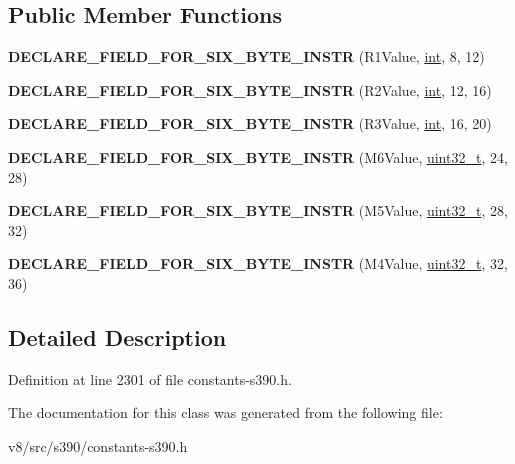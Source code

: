 \subsection*{Public Member Functions}
\begin{DoxyCompactItemize}
\item 
\mbox{\label{classv8_1_1internal_1_1VRR__C__Instruction_a70ae43e84e5f0782beb31729985f4ab5}} 
{\bfseries D\+E\+C\+L\+A\+R\+E\+\_\+\+F\+I\+E\+L\+D\+\_\+\+F\+O\+R\+\_\+\+S\+I\+X\+\_\+\+B\+Y\+T\+E\+\_\+\+I\+N\+S\+TR} (R1\+Value, \mbox{\hyperlink{classint}{int}}, 8, 12)
\item 
\mbox{\label{classv8_1_1internal_1_1VRR__C__Instruction_a3cc43c1da54fe11ee86626ee17661a4b}} 
{\bfseries D\+E\+C\+L\+A\+R\+E\+\_\+\+F\+I\+E\+L\+D\+\_\+\+F\+O\+R\+\_\+\+S\+I\+X\+\_\+\+B\+Y\+T\+E\+\_\+\+I\+N\+S\+TR} (R2\+Value, \mbox{\hyperlink{classint}{int}}, 12, 16)
\item 
\mbox{\label{classv8_1_1internal_1_1VRR__C__Instruction_ac7ce50fe90e9b4733cda2e9242778270}} 
{\bfseries D\+E\+C\+L\+A\+R\+E\+\_\+\+F\+I\+E\+L\+D\+\_\+\+F\+O\+R\+\_\+\+S\+I\+X\+\_\+\+B\+Y\+T\+E\+\_\+\+I\+N\+S\+TR} (R3\+Value, \mbox{\hyperlink{classint}{int}}, 16, 20)
\item 
\mbox{\label{classv8_1_1internal_1_1VRR__C__Instruction_a5a6171d94bf9d8dbbbc570d053179a4d}} 
{\bfseries D\+E\+C\+L\+A\+R\+E\+\_\+\+F\+I\+E\+L\+D\+\_\+\+F\+O\+R\+\_\+\+S\+I\+X\+\_\+\+B\+Y\+T\+E\+\_\+\+I\+N\+S\+TR} (M6\+Value, \mbox{\hyperlink{classuint32__t}{uint32\+\_\+t}}, 24, 28)
\item 
\mbox{\label{classv8_1_1internal_1_1VRR__C__Instruction_a54fe3c9c81da020a50153974dca1e7b3}} 
{\bfseries D\+E\+C\+L\+A\+R\+E\+\_\+\+F\+I\+E\+L\+D\+\_\+\+F\+O\+R\+\_\+\+S\+I\+X\+\_\+\+B\+Y\+T\+E\+\_\+\+I\+N\+S\+TR} (M5\+Value, \mbox{\hyperlink{classuint32__t}{uint32\+\_\+t}}, 28, 32)
\item 
\mbox{\label{classv8_1_1internal_1_1VRR__C__Instruction_ae3169e90f85578dc182e3e834b1de238}} 
{\bfseries D\+E\+C\+L\+A\+R\+E\+\_\+\+F\+I\+E\+L\+D\+\_\+\+F\+O\+R\+\_\+\+S\+I\+X\+\_\+\+B\+Y\+T\+E\+\_\+\+I\+N\+S\+TR} (M4\+Value, \mbox{\hyperlink{classuint32__t}{uint32\+\_\+t}}, 32, 36)
\end{DoxyCompactItemize}


\subsection{Detailed Description}


Definition at line 2301 of file constants-\/s390.\+h.



The documentation for this class was generated from the following file\+:\begin{DoxyCompactItemize}
\item 
v8/src/s390/constants-\/s390.\+h\end{DoxyCompactItemize}
